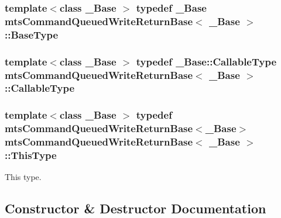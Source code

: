 \subsubsection[{Base\+Type}]{\setlength{\rightskip}{0pt plus 5cm}template$<$class \+\_\+\+Base $>$ typedef \+\_\+\+Base {\bf mts\+Command\+Queued\+Write\+Return\+Base}$<$ \+\_\+\+Base $>$\+::{\bf Base\+Type}}\label{classmts_command_queued_write_return_base_a1c16e3d09d9bb0071bb50f31ba81b4a8}
\hypertarget{classmts_command_queued_write_return_base_aa8635b9bab77a8e15f53f9f80415c420}{}
\subsubsection[{Callable\+Type}]{\setlength{\rightskip}{0pt plus 5cm}template$<$class \+\_\+\+Base $>$ typedef \+\_\+\+Base\+::\+Callable\+Type {\bf mts\+Command\+Queued\+Write\+Return\+Base}$<$ \+\_\+\+Base $>$\+::{\bf Callable\+Type}}\label{classmts_command_queued_write_return_base_aa8635b9bab77a8e15f53f9f80415c420}
\hypertarget{classmts_command_queued_write_return_base_af2f07528dc98cd88ab385e995f95a368}{}
\subsubsection[{This\+Type}]{\setlength{\rightskip}{0pt plus 5cm}template$<$class \+\_\+\+Base $>$ typedef {\bf mts\+Command\+Queued\+Write\+Return\+Base}$<$\+\_\+\+Base$>$ {\bf mts\+Command\+Queued\+Write\+Return\+Base}$<$ \+\_\+\+Base $>$\+::{\bf This\+Type}}\label{classmts_command_queued_write_return_base_af2f07528dc98cd88ab385e995f95a368}
This type. 

\subsection{Constructor \& Destructor Documentation}
\hypertarget{classmts_command_queued_write_return_base_a972b13c4891a8cc227d8c59062a8d584}{}
